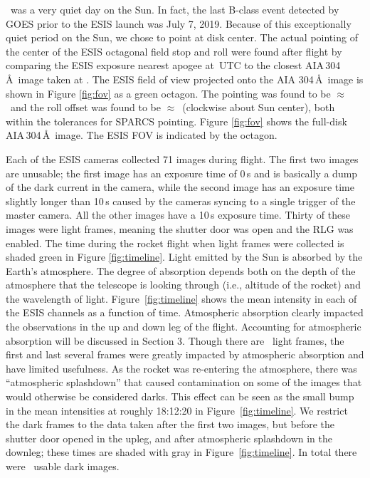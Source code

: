 	    \dateMission\ was a very quiet day on the Sun.  
	    In fact, the last  B-class event detected by GOES \citep{GOES} prior to the ESIS launch was July 7, 2019.  Because of this exceptionally quiet period on the Sun, we chose to point at disk center. 
	    The actual pointing of the center of the ESIS octagonal field stop and roll were found after flight by comparing the ESIS exposure nearest apogee at \timeApogeeFrame\,UTC to the closest AIA\,304\,\AA\ image taken at \aianearapogee.  
	    The ESIS field of view projected onto the AIA 304\,\AA\ image is shown in Figure \ref{fig:fov} as a green octagon.  
	    The pointing was found to be $\approx$ \esispointing \ and the roll offset was found to be $\approx$\esisroll \ (clockwise about Sun center), both within the tolerances for SPARCS pointing.  
	    Figure \ref{fig:fov} shows the full-disk AIA\,304\,\AA\ image. 
	    The ESIS FOV is indicated by the octagon.  
	    
		Each of the ESIS cameras collected 71 images during flight.  The first two images are unusable; the first image has an exposure time of 0\,s and is basically a dump of the dark current in the camera, while the second image has an exposure time slightly longer than 10\,s caused by the cameras syncing to a single trigger of the master camera.  
		All the other images have a 10\,s exposure time.  Thirty of these images were light frames, meaning the shutter door was open and the RLG was enabled. 
		The time during the rocket flight when light frames were collected is shaded green in Figure \ref{fig:timeline}.  
		Light emitted by the Sun is absorbed by the Earth's atmosphere.  
		The degree of absorption depends both on the depth of the atmosphere that the telescope is looking through (i.e., altitude of the rocket) and the wavelength of light.  
		Figure~\ref{fig:timeline} shows the mean intensity in each of the ESIS channels as a function of time.  Atmospheric absorption clearly impacted the observations in the up and down leg of the flight.  
		Accounting for atmospheric absorption will be discussed in Section 3.  
		Though there are \numDataFrames\ light frames, the first and last several frames were greatly impacted by atmospheric absorption and have limited usefulness.  As the rocket was re-entering the atmosphere, there was  ``atmospheric splashdown'' that caused contamination on some of the images that would otherwise be considered darks.  
		This effect can be seen as the small bump in the mean intensities at roughly 18:12:20 in Figure~\ref{fig:timeline}.  
		We restrict the dark frames to the data taken after the first two images, but before the shutter door opened in the upleg, and after atmospheric splashdown in the downleg; these times are shaded with gray in Figure~\ref{fig:timeline}.  
		In total there were \numDarkFrames\ usable dark images.  
		
